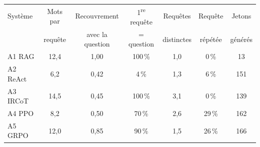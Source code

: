 \begin{tabular}{@{}lcccccc@{}}
\toprule
Système & Mots par & Recouvrement & 1\textsuperscript{re} requête & Requêtes & Requête & Jetons\\
 & requête & avec la question & = question & distinctes & répétée & générés\\
\midrule
A1 RAG & 12{,}4 & 1{,}00 & 100\,\% & 1{,}0 & 0\,\% & 13\\
A2 ReAct & 6{,}2 & 0{,}42 & 4\,\% & 1{,}3 & 6\,\% & 151\\
A3 IRCoT & 14{,}5 & 0{,}45 & 100\,\% & 3{,}1 & 0\,\% & 139\\
\midrule
A4 PPO & 8{,}2 & 0{,}50 & 70\,\% & 2{,}6 & 29\,\% & 162\\
A5 GRPO & 12{,}0 & 0{,}85 & 90\,\% & 1{,}5 & 26\,\% & 166\\
\bottomrule
\end{tabular}
